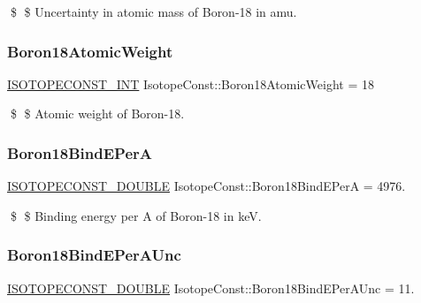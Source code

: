 \$ \$ Uncertainty in atomic mass of Boron-\/18 in amu. \mbox{\label{group___isotope_const-_boron-_b18_gaf2f234395ab7214b3b8d5a8a65c2b787}} 
\subsubsection{\texorpdfstring{Boron18\+Atomic\+Weight}{Boron18AtomicWeight}}
{\footnotesize\ttfamily \mbox{\hyperlink{group___isotope_const-_macros_ga5f18360b3e99483a35c32d789e62621c}{I\+S\+O\+T\+O\+P\+E\+C\+O\+N\+S\+T\+\_\+\+I\+NT}} Isotope\+Const\+::\+Boron18\+Atomic\+Weight = 18}

\$ \$ Atomic weight of Boron-\/18. \mbox{\label{group___isotope_const-_boron-_b18_ga90d5360a93ab68c570e6b0fb18944fa2}} 
\subsubsection{\texorpdfstring{Boron18\+Bind\+E\+PerA}{Boron18BindEPerA}}
{\footnotesize\ttfamily \mbox{\hyperlink{group___isotope_const-_macros_ga8f45a7272ce02c0b4c65c44636ed719a}{I\+S\+O\+T\+O\+P\+E\+C\+O\+N\+S\+T\+\_\+\+D\+O\+U\+B\+LE}} Isotope\+Const\+::\+Boron18\+Bind\+E\+PerA = 4976.}

\$ \$ Binding energy per A of Boron-\/18 in keV. \mbox{\label{group___isotope_const-_boron-_b18_ga33457b8f5a377db3eb80ad4c755a6226}} 
\subsubsection{\texorpdfstring{Boron18\+Bind\+E\+Per\+A\+Unc}{Boron18BindEPerAUnc}}
{\footnotesize\ttfamily \mbox{\hyperlink{group___isotope_const-_macros_ga8f45a7272ce02c0b4c65c44636ed719a}{I\+S\+O\+T\+O\+P\+E\+C\+O\+N\+S\+T\+\_\+\+D\+O\+U\+B\+LE}} Isotope\+Const\+::\+Boron18\+Bind\+E\+Per\+A\+Unc = 11.}

